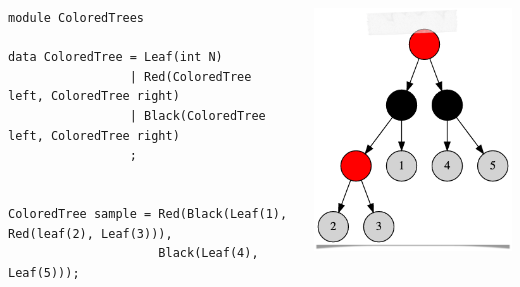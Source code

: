 \documentclass{beamer}
\begin{document}

\begin{frame}[fragile]

  \begin{columns}
  \begin{column}{0.7\textwidth}
  \begin{small}
  \begin{lstlisting}[language=Rascal]
module ColoredTrees

data ColoredTree = Leaf(int N)
                 | Red(ColoredTree left, ColoredTree right)
                 | Black(ColoredTree left, ColoredTree right)
                 ;


ColoredTree sample = Red(Black(Leaf(1), Red(leaf(2), Leaf(3))),
                     Black(Leaf(4), Leaf(5))); 
  \end{lstlisting}
  \end{small}
  \end{column}
  \begin{column}{0.3\textwidth}
    \begin{center}
      \pause \includegraphics[scale=0.25]{images/rb01.png}
  \end{center}    
  \end{column}
  \end{columns}
  
\end{frame}
\end{document}
